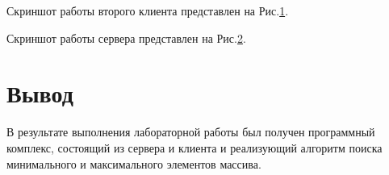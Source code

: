 \documentclass[russian,utf8,pointsection]{eskdtext}
\begin{document}
       	Скриншот работы второго клиента представлен на Рис.\ref{ris:1-3}.
       	\begin{figure}[!h]
       		\caption{}
       		\label{ris:1-3}
       	\end{figure}
       	\newpage
       	Скриншот работы сервера представлен на Рис.\ref{ris:1-4}.
       	\begin{figure}[!h]
       		\caption{}
       		\label{ris:1-4}
       	\end{figure}
       	       	
	\section{Вывод}
	В результате выполнения лабораторной работы был получен программный комплекс, состоящий из сервера и клиента и реализующий алгоритм поиска минимального и максимального элементов массива.
		
\end{document}

